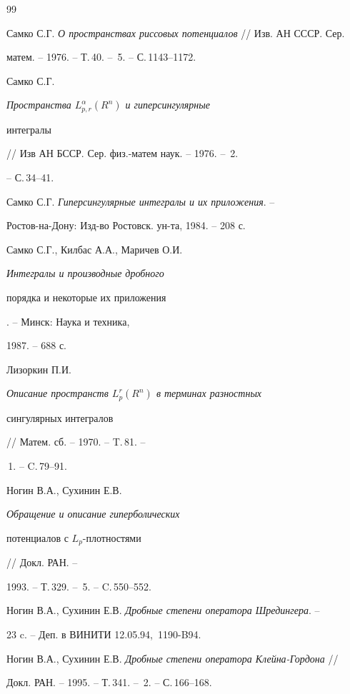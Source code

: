 \begin{thebibliography}{99}







Самко С.Г. {\em О пространствах риссовых потенциалов} // Изв. АН СССР. Сер.


матем. -- 1976. -- Т.\,40. -- \No\,5. -- С.\,1143--1172.




Самко С.Г. {\em Пространства $L_{p,r}^{\alpha}(R^n)$ и гиперсингулярные


интегралы} // Изв АН БССР. Сер. физ.-матем наук. -- 1976. -- \No\,2.


-- С.\,34--41.




Самко С.Г. {\em Гиперсингулярные интегралы и их приложения}. --


Ростов-на-Дону: Изд-во Ростовск. ун-та, 1984. -- 208 с.




Самко С.Г., Килбас А.А., Маричев О.И. {\em Интегралы и производные дробного


порядка и некоторые их приложения}. -- Минск: Наука и техника,


1987. -- 688 с.




Лизоркин П.И. {\em Описание пространств $L_p^r(R^n)$ в терминах разностных


сингулярных интегралов} // Матем. сб. -- 1970. -- T.\,81. --


\No\,1. -- C.\,79--91.




Ногин В.А., Сухинин Е.В. {\em Обращение и описание гиперболических


потенциалов с $L_p$-плотностями} // Докл. РАН. --


1993. -- Т.\,329. -- \No\,5. -- C.\,550--552.




Ногин В.А., Сухинин Е.В. {\em Дробные степени оператора Шредингера}. --


23 c. -- Деп. в ВИНИТИ 12.05.94, \No\,1190-B94.




Ногин В.А., Сухинин Е.В. {\em Дробные степени оператора Клейна-Гордона} //


Докл. РАН. -- 1995. -- Т.\,341. -- \No\,2. -- С.\,166--168.



\end{thebibliography}
